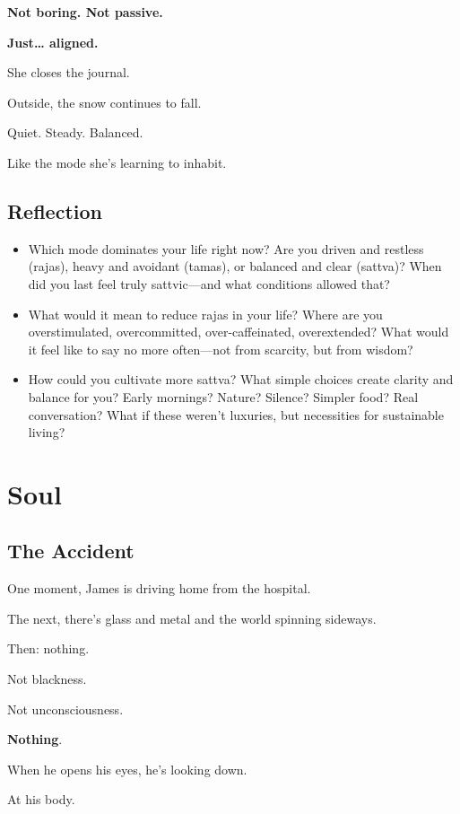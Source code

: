 \documentclass[11pt,twoside]{book}
\begin{document}
\textbf{Not boring. Not passive.}

\textbf{Just\ldots{} aligned.}

She closes the journal.

Outside, the snow continues to fall.

Quiet. Steady. Balanced.

Like the mode she's learning to inhabit.

\section*{Reflection}

\begin{itemize}
\item Which mode dominates your life right now? Are you driven and restless (rajas), heavy and avoidant (tamas), or balanced and clear (sattva)? When did you last feel truly sattvic—and what conditions allowed that?
\item What would it mean to reduce rajas in your life? Where are you overstimulated, overcommitted, over-caffeinated, overextended? What would it feel like to say no more often—not from scarcity, but from wisdom?
\item How could you cultivate more sattva? What simple choices create clarity and balance for you? Early mornings? Nature? Silence? Simpler food? Real conversation? What if these weren't luxuries, but necessities for sustainable living?
\end{itemize}

\chapter{Soul}

\section*{The Accident}

One moment, James is driving home from the hospital.

The next, there's glass and metal and the world spinning sideways.

Then: nothing.

Not blackness.

Not unconsciousness.

\textbf{Nothing}.

When he opens his eyes, he's looking down.

At his body.
\end{document}
